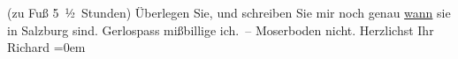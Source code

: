 \begin{ledgroupsized}[t]{13cm}
{                     (zu Fuß 5 ½ Stunden)}
                  \pend\settowidth{\longeste}{III Tag}\settowidth{\longestz}{(nach Sterzing 10-11 Stunden)}\settowidth{\longestd}{}\settowidth{\longestv}{}\settowidth{\longestf}{}\addtolength\longeste{1em}
        \addtolength\longestz{1em}
      \pstart\noindent{}
                  \pend\pstart
           {\pb}Überlegen Sie, und schreiben Sie
               mir noch genau \uline{wann} sie in Salzburg sind.\pend
           \pstart
           Gerlospass mißbillige ich. – Moserboden nicht.\pend
           \pstart
           Herzlichst Ihr{\\[\baselineskip]}\spacefill\mbox{Richard}\pend
           \leftskip=0em{}
         
         \endnumbering{}\end{ledgroupsized}  \newcommand{\dateiname}{L01062}\newcommand{\titel}{Richard Beer-Hofmann an Arthur Schnitzler, 2. 8. 1900}\newcommand{\editorInnen}{Martin Anton Müller und Gerd-Hermann Susen}
      